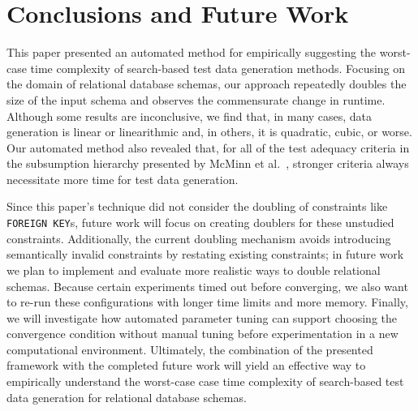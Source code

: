 
\vspace*{-.1in}
\section{Conclusions and Future Work}
\vspace*{-.1in}


This paper presented an automated method for empirically suggesting the worst-case time complexity of search-based test
data generation methods. Focusing on the domain of relational database schemas, our approach repeatedly doubles the size
of the input schema and observes the commensurate change in runtime. Although some results are inconclusive, we find
that, in many cases, data generation is linear or linearithmic and, in others, it is quadratic, cubic, or worse.  Our
automated method also revealed that, for all of the test adequacy criteria in the subsumption hierarchy presented by
McMinn et al.~\cite{mcminn2015}, stronger criteria always necessitate more time for test data generation.

Since this paper's technique did not consider the doubling of constraints like {\tt FOREIGN KEY}s, future work will
focus on creating doublers for these unstudied constraints. Additionally, the current doubling mechanism avoids
introducing semantically invalid constraints by restating existing constraints; in future work we plan to implement and
evaluate more realistic ways to double relational schemas. Because certain experiments timed out before converging, we
also want to re-run these configurations with longer time limits and more memory. Finally, we will investigate how
automated parameter tuning can support choosing the convergence condition without manual tuning before experimentation
in a new computational environment. Ultimately, the combination of the presented framework with the completed future
work will yield an effective way to empirically understand the worst-case case time complexity of search-based test data
generation for relational database schemas.
